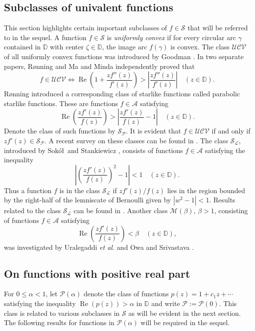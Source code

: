 \documentclass{amsart}
\begin{document}
\subsection{Subclasses of univalent functions}\label{sec11}
This section highlights certain important subclasses of $f\in\mathcal{S}$ that will be referred to in the sequel.
A function $f\in\mathcal{S}$ is \emph{uniformly convex}  if for every
circular arc $\gamma$ contained in $\mathbb{D}$ with center
$\zeta\in \mathbb{D}$, the image arc $f(\gamma)$ is convex. The class $\mathcal{UCV}$
of all uniformly convex  functions  was introduced by Goodman  \cite{ucv}.
In two separate papers, R\o nning \cite{ronn} and Ma and Minda \cite{maminda-ucv}
independently proved that
\begin{equation*}\label{e13}
f\in \mathcal{UCV} \Longleftrightarrow \operatorname{Re} \left( 1 +
\frac{zf''(z)}{f'(z)} \right) > \left|\frac{zf''(z)}{f'(z)} \right|
\quad ( z\in \mathbb{D}).
\end{equation*}
R\o nning introduced a corresponding class of starlike functions
called parabolic starlike functions. These are functions $f\in\mathcal{A}$ satisfying
\begin{equation*}\label{eq17} \operatorname{Re}\left(\frac{zf'(z)}{f(z)} \right)
>\left|\frac{zf'(z)}{f(z)}-1 \right|\quad ( z\in \mathbb{D}).
  \end{equation*}
Denote the class of such functions by $\mathcal{S}_\mathcal{ P}$. It is  evident that $f\in {\mathcal{UCV}}$ if and only if $zf'(z)\in {\mathcal{S}_{\mathcal{P}}}$. A recent survey on these classes can be found in \cite{raviucv}.  The class $ \mathcal{S}_\mathcal{ L}$, introduced by
Sok\'o\l\ and Stankiewicz \cite{sokol96}, consists of functions $f\in\mathcal{A}$ satisfying the inequality
\[
 \left|\left(\frac{zf'(z)}{f(z)}\right)^2-1\right|<1 \quad ( z\in \mathbb{D}).
\]
Thus a function $f$ is in the class $\mathcal{S}_\mathcal{ L}$  if $zf'(z)/f(z)$ lies in the
region bounded by the right-half of the lemniscate of Bernoulli
given by $|w^2-1|<1$. Results related to the  class  $\mathcal{S}_\mathcal{ L}$ can be found in \cite{nav,ali1,sokol09,sokol09b}.  Another class  $ \mathcal{M}(\beta)$, $\beta > 1$, consisting of functions $f\in\mathcal{A}$ satisfying
\[  \operatorname{Re}\left( \frac{zf'(z)}{f(z)}  \right) < \beta\quad ( z\in \mathbb{D}), \]   was investigated by Uralegaddi
{\em et al.} \cite{ural}  and  Owa and Srivastava \cite{owa2}.

\subsection{On functions with positive real part}\label{sec12}
For $ 0\leq \alpha<1$, let $\mathcal{P}(\alpha)$  denote the class of functions $p(z)=1+c_1z+\cdots $ satisfying the inequality $\operatorname{Re}(p(z))>\alpha$ in $\mathbb{D}$ and write $ \mathcal{P}:=\mathcal{P}(0)$. This class is related to various subclasses in  $\mathcal{S}$ as will be evident in the next section. The following results for functions in $\mathcal{P}(\alpha)$ will be required in the sequel.
\end{document}
